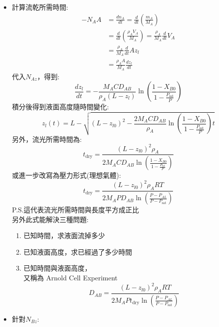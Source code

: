 \documentclass[../main.tex]{subfiles}
\begin{document}
\begin{itemize}
  \item 計算流乾所需時間:
  \begin{align}
    -N_A A &= \frac{dn_A}{dt}  = \frac{d}{dt}\left(\frac{m_A}{M_A}\right) \nonumber\\
    & = \frac{d}{dt}\left(\frac{\rho_A V_A}{M_A}\right) = \frac{\rho_A}{M_A} \frac{d}{dt} V_A \nonumber\\
    & = \frac{\rho_A}{M_A} \frac{d}{dt} A z_l \nonumber\\
    &= \frac{\rho_A A}{M_A} \frac{dz_l}{dt}
  \end{align}
  代入$N_{Az}$，得到:
  \begin{equation}
    \frac{dz_l}{dt} = - \frac{M_A C D_{AB}}{\rho_A (L - z_l)} \ln\left(\frac{1 - X_{B0}}{1 - \frac{P_{\text{sat}}}{P}}\right)
  \end{equation}
  積分後得到液面高度隨時間變化:
  \begin{equation}
    \boxed{z_l(t) = L - \sqrt{(L - z_{l0})^2 - \frac{2 M_A C D_{AB}}{\rho_A} \ln\left(\frac{1 - X_{B0}}{1 - \frac{P_{\text{sat}}}{P}}\right) t}}
  \end{equation}
  另外，流光所需時間為:
  \begin{equation}
    \boxed{t_{\text{dry}} = \frac{(L - z_{l0})^2 \rho_A}{2 M_A C D_{AB} \ln\left(\frac{1 - X_{B0}}{1 - \frac{P_{\text{sat}}}{P}}\right)}}
  \end{equation}
  或進一步改寫為壓力形式(理想氣體):
  \begin{equation}
    \boxed{t_{\text{dry}} = \frac{(L - z_{l0})^2 \rho_A R T}{2 M_A P D_{AB} \ln\left(\frac{P - P_{AL}}{P - P_{\text{sat}}}\right)}}
  \end{equation}
  P.S.這代表流光所需時間與長度平方成正比\\
  另外此式能解決三種問題:
  \begin{enumerate}
    \item 已知時間，求液面流掉多少
    \item 已知液面高度，求已經過了多少時間
    \item 已知時間與液面高度，\\
    又稱為 Arnold Cell Experiment
    \begin{equation}
      D_{AB} = \frac{(L - z_{l0})^2 \rho_A R T}{2 M_A P t_{\text{dry}} \ln\left(\frac{P - P_{AL}}{P - P_{\text{sat}}}\right)}
    \end{equation}
  \end{enumerate}
  \item 針對$N_{Bz}$:
  \begin{equation}

\end{equation}
\end{itemize}
\end{document}

